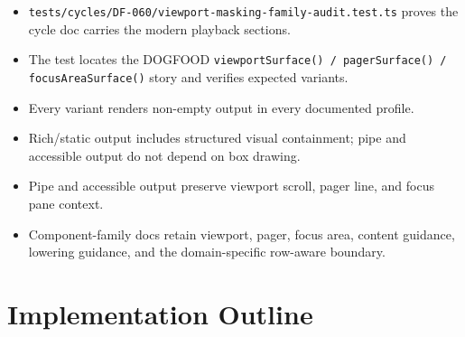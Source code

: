\begin{itemize}
\tightlist
\item
  \texttt{t\allowbreak{}e\allowbreak{}s\allowbreak{}t\allowbreak{}s\allowbreak{}/\allowbreak{}c\allowbreak{}y\allowbreak{}c\allowbreak{}l\allowbreak{}e\allowbreak{}s\allowbreak{}/\allowbreak{}D\allowbreak{}F\allowbreak{}-\allowbreak{}0\allowbreak{}6\allowbreak{}0\allowbreak{}/\allowbreak{}v\allowbreak{}i\allowbreak{}e\allowbreak{}w\allowbreak{}p\allowbreak{}o\allowbreak{}r\allowbreak{}t\allowbreak{}-\allowbreak{}m\allowbreak{}a\allowbreak{}s\allowbreak{}k\allowbreak{}i\allowbreak{}n\allowbreak{}g\allowbreak{}-\allowbreak{}f\allowbreak{}a\allowbreak{}m\allowbreak{}i\allowbreak{}l\allowbreak{}y\allowbreak{}-\allowbreak{}a\allowbreak{}u\allowbreak{}d\allowbreak{}i\allowbreak{}t\allowbreak{}.\allowbreak{}t\allowbreak{}e\allowbreak{}s\allowbreak{}t\allowbreak{}.\allowbreak{}t\allowbreak{}s} proves the cycle doc carries the modern playback sections.
\item
  The test locates the DOGFOOD \texttt{v\allowbreak{}i\allowbreak{}e\allowbreak{}w\allowbreak{}p\allowbreak{}o\allowbreak{}r\allowbreak{}t\allowbreak{}S\allowbreak{}u\allowbreak{}r\allowbreak{}f\allowbreak{}a\allowbreak{}c\allowbreak{}e\allowbreak{}(\allowbreak{})\allowbreak{} \allowbreak{}/\allowbreak{} \allowbreak{}p\allowbreak{}a\allowbreak{}g\allowbreak{}e\allowbreak{}r\allowbreak{}S\allowbreak{}u\allowbreak{}r\allowbreak{}f\allowbreak{}a\allowbreak{}c\allowbreak{}e\allowbreak{}(\allowbreak{})\allowbreak{} \allowbreak{}/\allowbreak{} \allowbreak{}f\allowbreak{}o\allowbreak{}c\allowbreak{}u\allowbreak{}s\allowbreak{}A\allowbreak{}r\allowbreak{}e\allowbreak{}a\allowbreak{}S\allowbreak{}u\allowbreak{}r\allowbreak{}f\allowbreak{}a\allowbreak{}c\allowbreak{}e\allowbreak{}(\allowbreak{})} story and verifies expected variants.
\item
  Every variant renders non-empty output in every documented profile.
\item
  Rich/static output includes structured visual containment; pipe and accessible output do not depend on box drawing.
\item
  Pipe and accessible output preserve viewport scroll, pager line, and focus pane context.
\item
  Component-family docs retain viewport, pager, focus area, content guidance, lowering guidance, and the domain-specific row-aware boundary.
\end{itemize}

\section{Implementation Outline}\label{record-100-implementation-outline}

